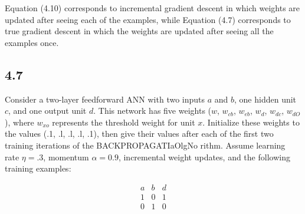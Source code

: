 Equation (4.10) corresponds to incremental gradient descent in which weights 
are updated after seeing each of the examples, while Equation (4.7) corresponds 
to true gradient descent in which the weights are updated after seeing all the 
examples once.

\subsection*{4.7}

Consider a two-layer feedforward ANN with two inputs $a$ and $b$, one hidden unit $c$, and one output unit $d$. This network has five weights ($w$, $w_{cb}$, $w_{eb}$, $w_{d}$, $w_{dc}$, $w_{dO}$), where $w_{xo}$ represents the threshold weight for unit $x$. Initialize these weights to the values (.1, .l, .l, .l, .1), then give their values after each of the first two training iterations of the BACKPROPAGATIaOlgNo rithm. Assume learning rate $\eta=.3$, momentum $\alpha=0.9$, incremental weight updates, and the following training examples:

\begin{equation}
\begin{matrix}
    a&b&d\\
    1&0&1\\
    0&1&0   \nonumber
\end{matrix}
\end{equation}